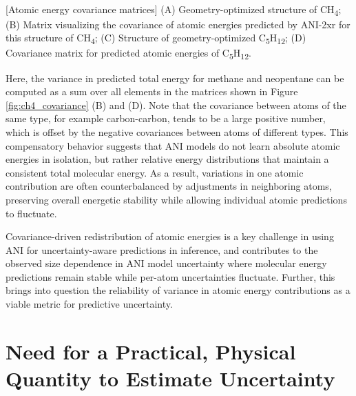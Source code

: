 \begin{flushleft}
\begin{multiFigure}
     \\
[Atomic energy covariance matrices]{
(A) Geometry-optimized structure of CH\textsubscript{4}; 
(B) Matrix visualizing the covariance of atomic energies predicted by ANI-2xr for this structure of CH\textsubscript{4}; 
(C) Structure of geometry-optimized C\textsubscript{5}H\textsubscript{12}; 
(D) Covariance matrix for predicted atomic energies of C\textsubscript{5}H\textsubscript{12}.}
\label{fig:ch4_covariance}
\end{multiFigure}
\end{flushleft}

Here, the variance in predicted total energy for methane and neopentane can be computed as a sum over all elements in the matrices shown in Figure \ref{fig:ch4_covariance} (B) and (D).
Note that the covariance between atoms of the same type, for example carbon-carbon, tends to be a large positive number, which is offset by the negative covariances between atoms of different types.
This compensatory behavior suggests that ANI models do not learn absolute atomic energies in isolation, but rather relative energy distributions that maintain a consistent total molecular energy. 
As a result, variations in one atomic contribution are often counterbalanced by adjustments in neighboring atoms, preserving overall energetic stability while allowing individual atomic predictions to fluctuate.

Covariance-driven redistribution of atomic energies is a key challenge in using ANI for uncertainty-aware predictions in inference, and contributes to the observed size dependence in ANI model uncertainty where molecular energy predictions remain stable while per-atom uncertainties fluctuate.
Further, this brings into question the reliability of variance in atomic energy contributions as a viable metric for predictive uncertainty.

\section{Need for a Practical, Physical Quantity to Estimate Uncertainty}
\label{sec:practical_physical_quantity_for_uncertainty}

